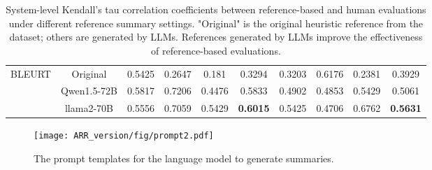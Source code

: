 \begin{table*}[]
\begin{center}
{\begin{tabular}{cccccccccc}
\multirow{3}{*}{BLEURT}    & Original    & 0.5425 & 0.2647 & 0.181  & 0.3294          & 0.3203 & 0.6176 & 0.2381 & 0.3929          \\
                           & Qwen1.5-72B & 0.5817 & 0.7206 & 0.4476 & 0.5833          & 0.4902 & 0.4853 & 0.5429 & 0.5061          \\
                           & llama2-70B  & 0.5556 & 0.7059 & 0.5429 & \textbf{0.6015} & 0.5425 & 0.4706 & 0.6762 & \textbf{0.5631} \\ \hline
\end{tabular}}
\end{center}
\caption{{System-level Kendall's tau correlation coefficients between reference-based and human evaluations under different reference summary settings. "Original" is the original heuristic reference from the dataset; others are generated by LLMs. References generated by LLMs improve the effectiveness of reference-based evaluations.}}
\label{tab:compare_kt_corr}
\end{table*}






\begin{figure}
    \centering
    \texttt{[image: ARR\_version/fig/prompt2.pdf]}
    \caption{ The prompt templates for the language model to generate summaries. }
    \label{fig:prompt}
\end{figure}



